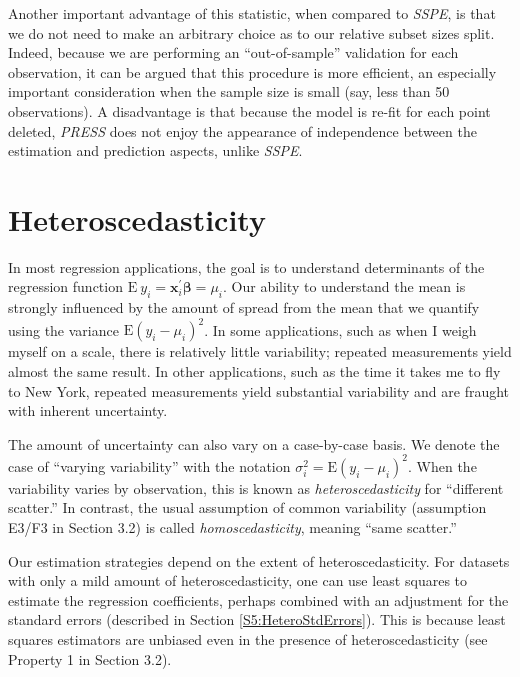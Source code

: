 Another important advantage of this statistic, when compared to
\textit{SSPE}, is that we do not need to make an arbitrary choice as
to our relative subset sizes split. Indeed, because we are
performing an ``out-of-sample'' validation for each observation, it
can be argued that this procedure is more efficient, an especially
important consideration when the sample size is small (say, less
than 50 observations). A disadvantage is that because the model is
re-fit for each point deleted, \textit{PRESS} does not enjoy the
appearance of independence between the estimation and prediction
aspects, unlike \textit{SSPE}.



\section{Heteroscedasticity}\label{S5:Heteroscedasticity}

In most regression applications, the goal is to understand
determinants of the regression function $\mathrm{E~}y_i =
\mathbf{x}_i^{\prime} \boldsymbol \beta =\mu_i$. Our ability to
understand the mean is strongly influenced by the amount of spread
from the mean that we quantify using the variance
$\mathrm{E}\left(y_i-\mu_i\right)^2$. In some applications, such as
when I weigh myself on a scale, there is relatively little
variability; repeated measurements yield almost the same result. In
other applications, such as the time it takes me to fly to New York,
repeated measurements yield substantial variability and are fraught
with inherent uncertainty.

The amount of uncertainty can also vary on a case-by-case basis. We
denote the case of ``varying variability'' with the notation
$\sigma_i^2=\mathrm{E}\left(y_i-\mu_i\right)^2$. When the
variability varies by observation, this is known as
\emph{heteroscedasticity} for ``different scatter.''  In contrast,
the usual assumption of common variability (assumption E3/F3 in
Section 3.2) is called \textit{homoscedasticity}, meaning ``same
scatter.''

Our estimation strategies depend on the extent of
heteroscedasticity. For datasets with only a mild amount of
heteroscedasticity, one can use least squares to estimate the
regression coefficients, perhaps combined with an adjustment for the
standard errors (described in Section \ref{S5:HeteroStdErrors}).
This is because least squares estimators are unbiased even in the
presence of heteroscedasticity (see Property 1 in Section 3.2).


